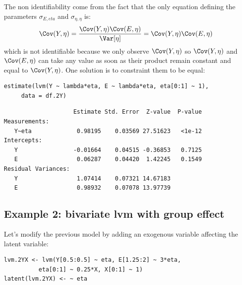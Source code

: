 \documentclass[12pt]{article}
\begin{document}
The non identifiability come from the fact that the only equation
defining the parameters \(\sigma_{E,eta}\) and \(\sigma_{\eta,\eta}\) is:
\begin{align*}
\Cov(Y,\eta)=\frac{\Cov(Y,\eta)\Cov(E,\eta)}{\Var[\eta]} = \Cov(Y,\eta)\Cov(E,\eta)
\end{align*}
which is not identifiable because we only observe \(\Cov(Y,\eta)\) so
\(\Cov(Y,\eta)\) and \(\Cov(E,\eta)\) can take any value as soon as
their product remain constant and equal to \(\Cov(Y,\eta)\). One
solution is to constraint them to be equal:

\bigskip

\lstset{language=r,label= ,caption= ,captionpos=b,numbers=none}
\begin{lstlisting}
estimate(lvm(Y ~ lambda*eta, E ~ lambda*eta, eta[0:1] ~ 1), 
	 data = df.2Y)
\end{lstlisting}

\begin{verbatim}
                    Estimate Std. Error  Z-value  P-value
Measurements:                                            
   Y~eta             0.98195    0.03569 27.51623   <1e-12
Intercepts:                                              
   Y                -0.01664    0.04515 -0.36853   0.7125
   E                 0.06287    0.04420  1.42245   0.1549
Residual Variances:                                      
   Y                 1.07414    0.07321 14.67183         
   E                 0.98932    0.07078 13.97739
\end{verbatim}

\clearpage

\subsection{Example 2: bivariate lvm with group effect}
\label{sec:org473ce17}

Let's modify the previous model by adding an exogenous variable
affecting the latent variable:

\lstset{language=r,label= ,caption= ,captionpos=b,numbers=none}
\begin{lstlisting}
lvm.2YX <- lvm(Y[0.5:0.5] ~ eta, E[1.25:2] ~ 3*eta,
	      eta[0:1] ~ 0.25*X, X[0:1] ~ 1)
latent(lvm.2YX) <- ~ eta
\end{lstlisting}

\vspace{-1cm}
\end{document}
